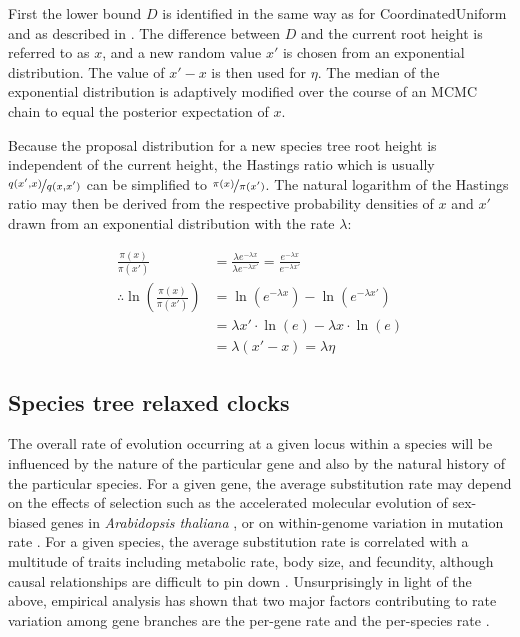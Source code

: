 \documentclass[12pt]{article}
\begin{document}
First the lower bound $D$ is identified in the same way as for
CoordinatedUniform and as described in \cite{Jones2016}. The difference
between $D$ and the current root height is referred to as $x$, and a new
random value $x'$ is chosen from an exponential distribution. The value of $x'
- x$ is then used for $\eta$. The median of the exponential distribution is
adaptively modified over the course of an MCMC chain to equal the posterior
expectation of $x$.

Because the proposal distribution for a new species tree root height is
independent of the current height, the Hastings ratio which is usually
$\nicefrac{q(x',x)}{q(x,x')}$ \citep{Hastings1970} can be simplified to
$\nicefrac{\pi(x)}{\pi(x')}$. The natural logarithm of the Hastings ratio may then
be derived from the respective probability densities of $x$ and
$x'$ drawn from an exponential distribution with the rate $\lambda$:

\begin{align}
\frac{\pi(x)}{\pi(x')} &= \frac{\lambda e^{-\lambda x}}{\lambda e^{-\lambda x'}} = \frac{e^{-\lambda x}}{e^{-\lambda x'}}\\
\therefore \ln\left(\frac{\pi(x)}{\pi(x')}\right) &= \ln \left(e^{-\lambda x}\right) - \ln \left(e^{-\lambda x'}\right)\\
& = \lambda x' \cdot \ln \left(e\right) - \lambda x \cdot \ln \left(e\right)\\
& = \lambda \left(x' - x\right) = \lambda \eta
\end{align}

\subsection{Species tree relaxed clocks}

The overall rate of evolution occurring at a given locus within a species will
be influenced by the nature of the particular gene and also by the natural
history of the particular species. For a given gene, the average substitution
rate may depend on the effects of selection such as the accelerated molecular
evolution of sex-biased genes in \textit{Arabidopsis thaliana}
\citep{Gossmann01032014}, or on within-genome variation in mutation rate \citep{Baer2007}.
For a given species, the average substitution rate is correlated with a
multitude of traits including metabolic rate, body size, and fecundity, although
causal relationships are difficult to pin down \citep{Bromham2503}.
Unsurprisingly in light of the above, empirical analysis has shown that two
major factors contributing to rate variation among gene branches are the
per-gene rate and the per-species rate \citep{Rasmussen01122007}.
\end{document}
